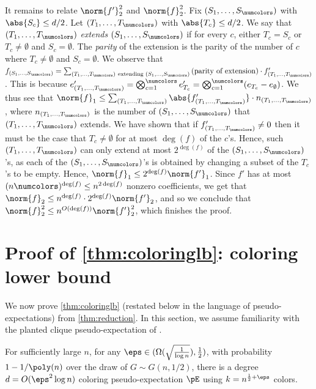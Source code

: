 It remains to relate $\norm{f'}_2^2$ and $\norm{f}_2^2$. Fix $(S_1, \dots, S_\numcolors)$ with $\abs{S_c} \leq d/2$. Let $(T_1, \dots, T_\numcolors)$ with $\abs{T_c} \leq d/2$. We say that $(T_1, \dots, T_\numcolors)$ \emph{extends} $(S_1, \dots, S_\numcolors)$ if for every $c$, either $T_c = S_c$ or $T_c \ne \emptyset$ and $S_c = \emptyset$. The \emph{parity} of the extension is the parity of the number of $c$ where $T_c \ne \emptyset$ and $S_c = \emptyset$. We observe that $f_{(S_1, \dots, S_\numcolors)} = \sum_{(T_1, \dots, T_\numcolors) \ \text{extending } (S_1, \dots, S_\numcolors)} \text{(parity of extension)} \cdot f'_{(T_1, \dots, T_\numcolors)}$. This is because $e'_{(T_1, \dots, T_\numcolors)} = \bigotimes_{c = 1}^\numcolors e'_{T_c} = \bigotimes_{c = 1}^\numcolors (e_{T_c} - e_{\emptyset})$. We thus see that $\norm{f}_1 \leq \sum_{(T_1, \dots, T_\numcolors)} \abs{f'_{(T_1, \dots, T_\numcolors)}} \cdot n_{(T_1, \dots, T_\numcolors)}$, where $n_{(T_1, \dots, T_\numcolors)}$ is the number of $(S_1, \dots, S_\numcolors)$ that $(T_1, \dots, T_\numcolors)$ extends. We have shown that if $f'_{(T_1, \dots, T_\numcolors)} \ne 0$ then it must be the case that $T_{c} \ne \emptyset$ for at most $\deg(f)$ of the $c$'s. Hence, such $(T_1, \dots, T_\numcolors)$ can only extend at most $2^{\deg(f)}$ of the $(S_1, \dots, S_\numcolors)$'s, as each of the $(S_1, \dots, S_\numcolors)$'s is obtained by changing a subset of the $T_c$'s to be empty. Hence, $\norm{f}_1 \leq 2^{\deg(f)} \norm{f'}_1$. Since $f'$ has at most $(n\numcolors)^{\deg(f)} \leq n^{2 \deg(f)}$ nonzero coefficients, we get that $\norm{f}_2 \leq n^{ \deg(f)} \cdot 2^{\deg(f)} \norm{f'}_2$, and so we conclude that $\norm{f}_2^2 \leq n^{O(\deg(f))} \norm{f'}_2^2$, which finishes the proof.








\section{Proof of \cref{thm:coloringlb}: coloring lower bound}
\label{sec:fmain}
We now prove \cref{thm:coloringlb} (restated below in the language of pseudo-expectations) from \cref{thm:reduction}. In this section, we assume familiarity with the planted clique pseudo-expectation of \cite{DBLP:conf/focs/BarakHKKMP16}. 
\begin{theorem*}
For sufficiently large $n$, for any $\eps \in (\Omega(\sqrt{\frac{1}{\log n}}), \frac{1}{2})$, with probability $1 - 1/\poly(n)$ over the draw of $G \sim G(n,1/2)$, there is a degree $d = O(\eps^2 \log n)$ coloring pseudo-expectation $\pE$ using $k = n^{\frac{1}{2} + \eps}$ colors.
\end{theorem*}

